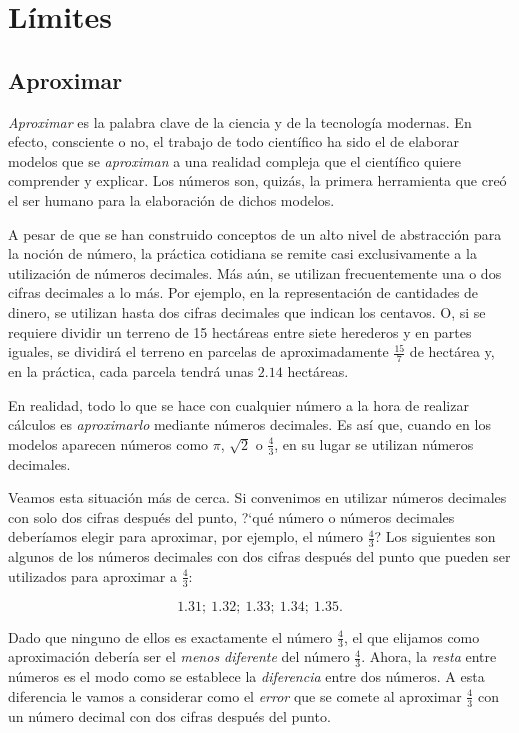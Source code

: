 \chapter[Límites]{Límites}

\section{Aproximar}

\textit{Aproximar} es la palabra clave de la ciencia y de la tecnología modernas. En efecto,
consciente o no, el trabajo de todo científico ha sido el de elaborar modelos que se
\textit{aproximan} a una realidad compleja que el científico quiere comprender y explicar. Los
números son, quizás, la primera herramienta que creó el ser humano para la elaboración de dichos
modelos.

A pesar de que se han construido conceptos de un alto nivel de abstracción para la noción de
número, la práctica cotidiana se remite casi exclusivamente a la utilización de números decimales.
Más aún, se utilizan frecuentemente una o dos cifras decimales a lo más. Por ejemplo, en la
representación de cantidades de dinero, se utilizan hasta dos cifras decimales que indican los
centavos. O, si se requiere dividir un terreno de 15 hectáreas entre siete herederos y en partes
iguales, se dividirá el terreno en parcelas de aproximadamente $\frac{15}{7}$ de hectárea y, en la
práctica, cada parcela tendrá unas $2.14$ hectáreas.

En realidad, todo lo que se hace con cualquier número a la hora de realizar cálculos es
\textit{aproximarlo} mediante números decimales. Es así que, cuando en los modelos aparecen números
como $\pi$, $\sqrt{2}$ o $\frac{4}{3}$, en su lugar se utilizan números decimales.

Veamos esta situación más de cerca. Si convenimos en utilizar números decimales con solo dos cifras
después del punto, ?`qué número o números decimales deberíamos elegir para aproximar, por ejemplo,
el número $\frac{4}{3}$? Los siguientes son algunos de los números decimales con dos cifras después
del punto que pueden ser utilizados para aproximar a $\frac{4}{3}$:

\[
1.31; \ 1.32; \ 1.33; \ 1.34; \ 1.35.
\]

Dado que ninguno de ellos es exactamente el número $\frac{4}{3}$, el que elijamos como aproximación
debería ser el \textit{menos diferente} del número $\frac{4}{3}$. Ahora, la \textit{resta} entre
números es el modo como se establece la \textit{diferencia} entre dos números. A esta diferencia le
vamos a considerar como el \textit{error} que se comete al aproximar $\frac{4}{3}$ con un número
decimal con dos cifras después del punto.

